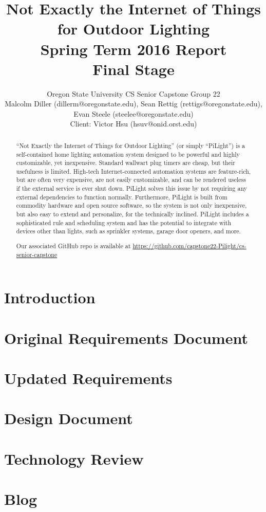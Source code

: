 \documentclass[10pt,draftclsnofoot,onecolumn]{IEEEtran}
\title{Not Exactly the Internet of Things for Outdoor Lighting\\ Spring Term 2016 Report\\ Final Stage}
\author{Oregon State University CS Senior Capstone Group 22\\Malcolm Diller (dillerm@oregonstate.edu), Sean Rettig (rettigs@oregonstate.edu), Evan Steele (steelee@oregonstate.edu)\\Client: Victor Hsu (hsuv@onid.orst.edu)}
\begin{document}
\maketitle
\begin{abstract}

``Not Exactly the Internet of Things for Outdoor Lighting'' (or simply
``PiLight'') is a self-contained home lighting automation system designed to be
powerful and highly customizable, yet inexpensive.  Standard wallwart plug
timers are cheap, but their usefulness is limited.  High-tech
Internet-connected automation systems are feature-rich, but are often very
expensive, are not easily customizable, and can be rendered useless if the
external service is ever shut down.  PiLight solves this issue by not requiring
any external dependencies to function normally.  Furthermore, PiLight is built
from commodity hardware and open source software, so the system is not only
inexpensive, but also easy to extend and personalize, for the technically
inclined.  PiLight includes a sophisticated rule and scheduling system and has
the potential to integrate with devices other than lights, such as sprinkler
systems, garage door openers, and more.

Our associated GitHub repo is available at
\url{https://github.com/capstone22-Pilight/cs-senior-capstone}

\end{abstract}
\newpage
\tableofcontents
\newpage
\section{Introduction}

\section{Original Requirements Document}

\section{Updated Requirements}

\section{Design Document}

\section{Technology Review}

\section{Blog}

\end{document}
